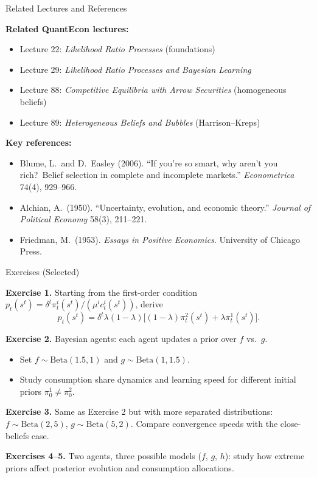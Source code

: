 \documentclass[aspectratio=169,12pt]{beamer}
\begin{document}
\begin{frame}{Related Lectures and References}

\textbf{Related QuantEcon lectures:}
\begin{itemize}
  \item Lecture 22: \emph{Likelihood Ratio Processes} (foundations)
  \item Lecture 29: \emph{Likelihood Ratio Processes and Bayesian Learning}
  \item Lecture 88: \emph{Competitive Equilibria with Arrow Securities} (homogeneous beliefs)
  \item Lecture 89: \emph{Heterogeneous Beliefs and Bubbles} (Harrison--Kreps)
\end{itemize}

\bigskip
\textbf{Key references:}
\begin{itemize}
  \item Blume, L.\ and D.\ Easley (2006). ``If you're so smart, why aren't you
        rich?\ Belief selection in complete and incomplete markets.''
        \emph{Econometrica} 74(4), 929--966.
  \item Alchian, A.\ (1950). ``Uncertainty, evolution, and economic theory.''
        \emph{Journal of Political Economy} 58(3), 211--221.
  \item Friedman, M.\ (1953). \emph{Essays in Positive Economics}.
        University of Chicago Press.
\end{itemize}

\end{frame}

\begin{frame}{Exercises (Selected)}

\textbf{Exercise 1.} Starting from the first-order condition
$p_t(s^t) = \delta^t\pi_t^i(s^t)/(\mu^i c_t^i(s^t))$, derive
\[
  p_t(s^t) = \delta^t\lambda(1-\lambda)\bigl[(1-\lambda)\pi_t^2(s^t)+\lambda\pi_t^1(s^t)\bigr].
\]

\bigskip
\textbf{Exercise 2.} Bayesian agents: each agent updates a prior over $f$ vs.\ $g$.
\begin{itemize}
  \item Set $f\sim\text{Beta}(1.5,1)$ and $g\sim\text{Beta}(1,1.5)$.
  \item Study consumption share dynamics and learning speed for different
        initial priors $\pi_0^1\neq\pi_0^2$.
\end{itemize}

\bigskip
\textbf{Exercise 3.} Same as Exercise 2 but with more separated distributions:
$f\sim\text{Beta}(2,5)$, $g\sim\text{Beta}(5,2)$.
Compare convergence speeds with the close-beliefs case.

\bigskip
\textbf{Exercises 4--5.} Two agents, three possible models ($f$, $g$, $h$):
study how extreme priors affect posterior evolution and consumption allocations.

\end{frame}

\end{document}
